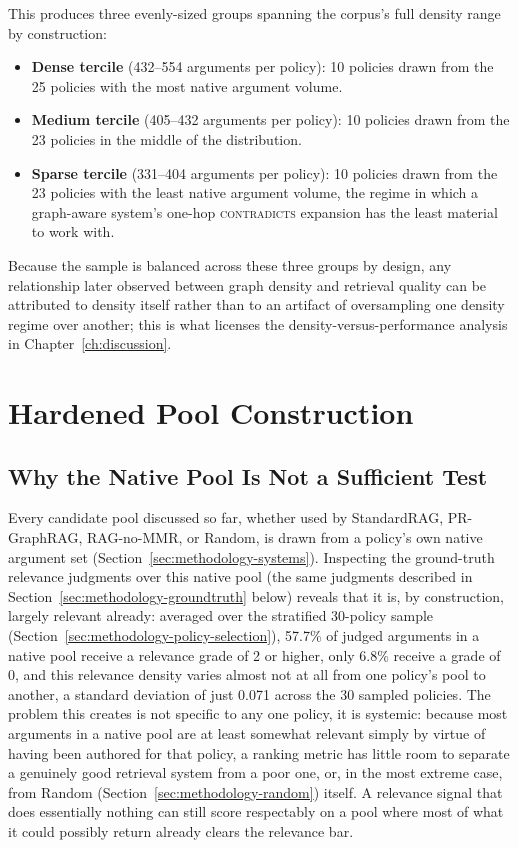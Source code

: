 This produces three evenly-sized groups spanning the corpus's full density range by construction:

\begin{itemize}
\item \textbf{Dense tercile} (432--554 arguments per policy): 10 policies drawn from the 25
policies with the most native argument volume.

\item \textbf{Medium tercile} (405--432 arguments per policy): 10 policies drawn from the 23
policies in the middle of the distribution.

\item \textbf{Sparse tercile} (331--404 arguments per policy): 10 policies drawn from the 23
policies with the least native argument volume, the regime in which a graph-aware system's
one-hop \textsc{contradicts} expansion has the least material to work with.
\end{itemize}

Because the sample is balanced across these three groups by design, any relationship later
observed between graph density and retrieval quality can be attributed to density itself rather
than to an artifact of oversampling one density regime over another; this is what licenses the
density-versus-performance analysis in Chapter~\ref{ch:discussion}.

\section{Hardened Pool Construction}
\label{sec:methodology-hardened-pool}

\subsection{Why the Native Pool Is Not a Sufficient Test}
\label{sec:methodology-hardened-motivation}

Every candidate pool discussed so far, whether used by StandardRAG, PR-GraphRAG, RAG-no-MMR, or
Random, is drawn from a policy's own native argument set (Section~\ref{sec:methodology-systems}).
Inspecting the ground-truth relevance judgments over this native pool (the same judgments
described in Section~\ref{sec:methodology-groundtruth} below) reveals that it is, by construction,
largely relevant already: averaged over the stratified 30-policy sample
(Section~\ref{sec:methodology-policy-selection}), 57.7\% of judged arguments in a native pool
receive a relevance grade of 2 or higher, only 6.8\% receive a grade of 0, and this relevance
density varies almost not at all from one policy's pool to another, a standard deviation of just
0.071 across the 30 sampled policies. The problem this creates is not specific to any one policy,
it is systemic: because most arguments in a native pool are at least somewhat relevant simply by
virtue of having been authored for that policy, a ranking metric has little room to separate a
genuinely good retrieval system from a poor one, or, in the most extreme case, from Random
(Section~\ref{sec:methodology-random}) itself. A relevance signal that does essentially nothing
can still score respectably on a pool where most of what it could possibly return already clears
the relevance bar.

